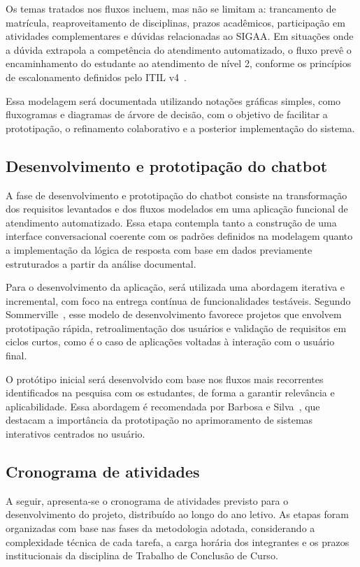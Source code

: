 Os temas tratados nos fluxos incluem, mas não se limitam a: trancamento de matrícula, reaproveitamento de disciplinas, prazos acadêmicos, participação em atividades complementares e dúvidas relacionadas ao SIGAA. Em situações onde a dúvida extrapola a competência do atendimento automatizado, o fluxo prevê o encaminhamento do estudante ao atendimento de nível 2, conforme os princípios de escalonamento definidos pelo ITIL v4~\cite{axelos2019itil}.

Essa modelagem será documentada utilizando notações gráficas simples, como fluxogramas e diagramas de árvore de decisão, com o objetivo de facilitar a prototipação, o refinamento colaborativo e a posterior implementação do sistema.

\subsection{Desenvolvimento e prototipação do chatbot}

A fase de desenvolvimento e prototipação do chatbot consiste na transformação dos requisitos levantados e dos fluxos modelados em uma aplicação funcional de atendimento automatizado. Essa etapa contempla tanto a construção de uma interface conversacional coerente com os padrões definidos na modelagem quanto a implementação da lógica de resposta com base em dados previamente estruturados a partir da análise documental.

Para o desenvolvimento da aplicação, será utilizada uma abordagem iterativa e incremental, com foco na entrega contínua de funcionalidades testáveis. Segundo Sommerville~\cite{sommerville2011}, esse modelo de desenvolvimento favorece projetos que envolvem prototipação rápida, retroalimentação dos usuários e validação de requisitos em ciclos curtos, como é o caso de aplicações voltadas à interação com o usuário final.

O protótipo inicial será desenvolvido com base nos fluxos mais recorrentes identificados na pesquisa com os estudantes, de forma a garantir relevância e aplicabilidade. Essa abordagem é recomendada por Barbosa e Silva~\cite{barbosa2010interacao}, que destacam a importância da prototipação no aprimoramento de sistemas interativos centrados no usuário.

\subsection{Cronograma de atividades}

A seguir, apresenta-se o cronograma de atividades previsto para o desenvolvimento do projeto, distribuído ao longo do ano letivo. As etapas foram organizadas com base nas fases da metodologia adotada, considerando a complexidade técnica de cada tarefa, a carga horária dos integrantes e os prazos institucionais da disciplina de Trabalho de Conclusão de Curso.

